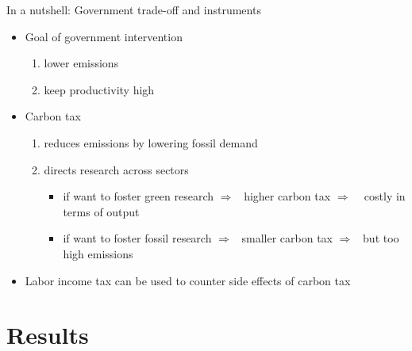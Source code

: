 \documentclass[11pt,aspectratio=169]{beamer}
\newcommand{\ar}{$\Rightarrow$ \ }
\begin{document}
\begin{frame}{In a nutshell: Government trade-off and instruments}
	\pause
	\begin{itemize}[<+-| alert@+>]
		\item 	Goal of government intervention
		\begin{enumerate}
			\item[a)] lower emissions
			\item[b)] keep productivity high
		\end{enumerate}
		\vspace{3mm}
		\item Carbon tax
		\begin{enumerate}
			\item[a)] reduces emissions by lowering fossil demand
			\item[b)] directs research across sectors
			\begin{itemize}
				\item[-] if want to foster green research
				\ar higher carbon tax \ar %
				costly in terms of output %
				\item[-] if want to foster fossil research \ar smaller carbon tax \ar but too high emissions
			\end{itemize}
		\end{enumerate}
		\item Labor income tax can be used to counter side effects of carbon tax 
	\end{itemize}
\end{frame}
\hypertarget{resback}{}
\section{Results}
\end{document}
